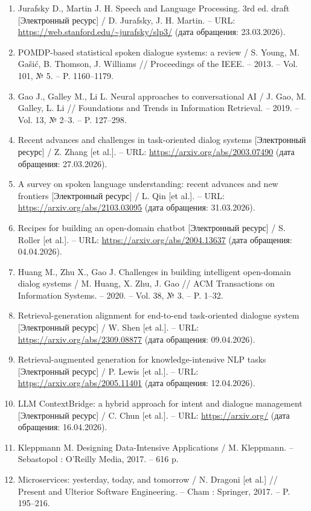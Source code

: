 \documentclass[14pt,a4paper]{extarticle}
\numberwithin{figure}{section}
\numberwithin{table}{section}
\begin{document}
\begin{enumerate}
\item Jurafsky D., Martin J. H. Speech and Language Processing. 3rd ed. draft [Электронный ресурс] / D. Jurafsky, J. H. Martin. -- URL: \url{https://web.stanford.edu/~jurafsky/slp3/} (дата обращения: 23.03.2026).
\item POMDP-based statistical spoken dialogue systems: a review / S. Young, M. Gašić, B. Thomson, J. Williams // Proceedings of the IEEE. -- 2013. -- Vol. 101, № 5. -- P. 1160--1179.
\item Gao J., Galley M., Li L. Neural approaches to conversational AI / J. Gao, M. Galley, L. Li // Foundations and Trends in Information Retrieval. -- 2019. -- Vol. 13, № 2--3. -- P. 127--298.
\item Recent advances and challenges in task-oriented dialog systems [Электронный ресурс] / Z. Zhang [et al.]. -- URL: \url{https://arxiv.org/abs/2003.07490} (дата обращения: 27.03.2026).
\item A survey on spoken language understanding: recent advances and new frontiers [Электронный ресурс] / L. Qin [et al.]. -- URL: \url{https://arxiv.org/abs/2103.03095} (дата обращения: 31.03.2026).
\item Recipes for building an open-domain chatbot [Электронный ресурс] / S. Roller [et al.]. -- URL: \url{https://arxiv.org/abs/2004.13637} (дата обращения: 04.04.2026).
\item Huang M., Zhu X., Gao J. Challenges in building intelligent open-domain dialog systems / M. Huang, X. Zhu, J. Gao // ACM Transactions on Information Systems. -- 2020. -- Vol. 38, № 3. -- P. 1--32.
\item Retrieval-generation alignment for end-to-end task-oriented dialogue system [Электронный ресурс] / W. Shen [et al.]. -- URL: \url{https://arxiv.org/abs/2309.08877} (дата обращения: 09.04.2026).
\item Retrieval-augmented generation for knowledge-intensive NLP tasks [Электронный ресурс] / P. Lewis [et al.]. -- URL: \url{https://arxiv.org/abs/2005.11401} (дата обращения: 12.04.2026).
\item LLM ContextBridge: a hybrid approach for intent and dialogue management [Электронный ресурс] / C. Chun [et al.]. -- URL: \url{https://arxiv.org/} (дата обращения: 16.04.2026).
\item Kleppmann M. Designing Data-Intensive Applications / M. Kleppmann. -- Sebastopol : O'Reilly Media, 2017. -- 616 p.
\item Microservices: yesterday, today, and tomorrow / N. Dragoni [et al.] // Present and Ulterior Software Engineering. -- Cham : Springer, 2017. -- P. 195--216.

\end{enumerate}
\end{document}
